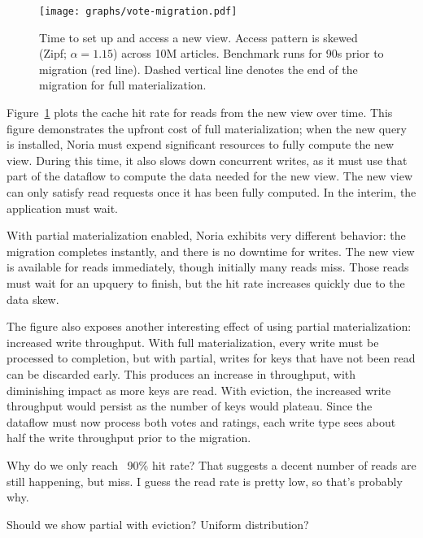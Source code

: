 \begin{figure}[t]
  \centering
  \texttt{[image: graphs/vote-migration.pdf]}
  \caption{Time to set up and access a new view. Access pattern is skewed (Zipf;
  $\alpha = 1.15$) across 10M articles. Benchmark runs for 90s prior to
  migration (red line). Dashed vertical line denotes the end of the migration
  for full materialization.}
  \label{f:vote-migration}
\end{figure}

Figure~\ref{f:vote-migration} plots the cache hit rate for reads from the new
view over time. This figure demonstrates the upfront cost of full
materialization; when the new query is installed, Noria must expend significant
resources to fully compute the new view. During this time, it also slows down
concurrent writes, as it must use that part of the dataflow to compute the data
needed for the new view. The new view can only satisfy read requests once it has
been fully computed. In the interim, the application must wait.

With partial materialization enabled, Noria exhibits very different behavior:
the migration completes instantly, and there is no downtime for writes. The new
view is available for reads immediately, though initially many reads miss. Those
reads must wait for an upquery to finish, but the hit rate increases quickly due
to the data skew.

\begin{inprogress}
The figure also exposes another interesting effect of using partial
materialization: increased write throughput. With full materialization, every
write must be processed to completion, but with partial, writes for keys that
have not been read can be discarded early. This produces an increase in
throughput, with diminishing impact as more keys are read. With eviction, the
increased write throughput would persist as the number of keys would plateau.
Since the dataflow must now process both votes and ratings, each write type sees
about half the write throughput prior to the migration.
\end{inprogress}

\begin{inprogress}
  Why do we only reach ~90\% hit rate? That suggests a decent number of reads
  are still happening, but miss. I guess the read rate is pretty low, so that's
  probably why.
\end{inprogress}

\begin{inprogress}
  Should we show partial with eviction?
  Uniform distribution?
\end{inprogress}

